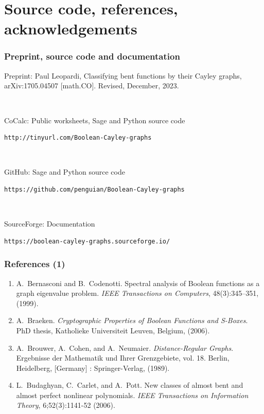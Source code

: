 \documentclass[pdf,sprung,slideColor,nocolorBG]{beamer}
\newenvironment{colortheme}[1]{
\def\ProvidesPackageRCS $##1${\relax}
\renewcommand{\ProcessOptions}{\relax}
\makeatletter

\makeatother
}{}
\begin{document}
\section{Source code, references, acknowledgements}

\begin{colortheme}{access}

\begin{frame}[fragile]
\frametitle{Preprint, source code and documentation}
Preprint: Paul Leopardi, Classifying bent functions by their Cayley graphs,  arXiv:1705.04507 [math.CO]. Revised, December, 2023.

~

CoCalc: Public worksheets, Sage and Python source code
\begin{verbatim}
http://tinyurl.com/Boolean-Cayley-graphs
\end{verbatim}

~

GitHub: Sage and Python source code
\begin{verbatim}
https://github.com/penguian/Boolean-Cayley-graphs
\end{verbatim}

~

SourceForge: Documentation
\begin{verbatim}
https://boolean-cayley-graphs.sourceforge.io/
\end{verbatim}
\end{frame}
\begin{frame}
\frametitle{References (1)}
\small{}
\begin{enumerate}
 \item
A.~Bernasconi and B.~Codenotti.
Spectral analysis of {Boolean} functions as a graph eigenvalue problem.
{\em IEEE Transactions on Computers}, 48(3):345--351, (1999).
 \item
A.~Braeken.
{\em Cryptographic Properties of Boolean Functions and S-Boxes}.
{PhD} thesis, Katholieke Universiteit Leuven, Belgium, (2006).
 \item
A.~Brouwer, A.~Cohen, and A.~Neumaier.
{\em Distance-Regular Graphs}.
Ergebnisse der Mathematik und Ihrer Grenzgebiete, vol. 18.
Berlin, Heidelberg, [Germany] : Springer-Verlag, (1989).
 \item
L.~Budaghyan, C.~Carlet, and A.~Pott.
New classes of almost bent and almost perfect nonlinear polynomials.
{\em IEEE Transactions on Information Theory}, 6;52(3):1141-52 (2006).
\setcounter{enumisave}{\value{enumi}}
\end{enumerate}
\end{frame}


\end{colortheme}
\end{document}
